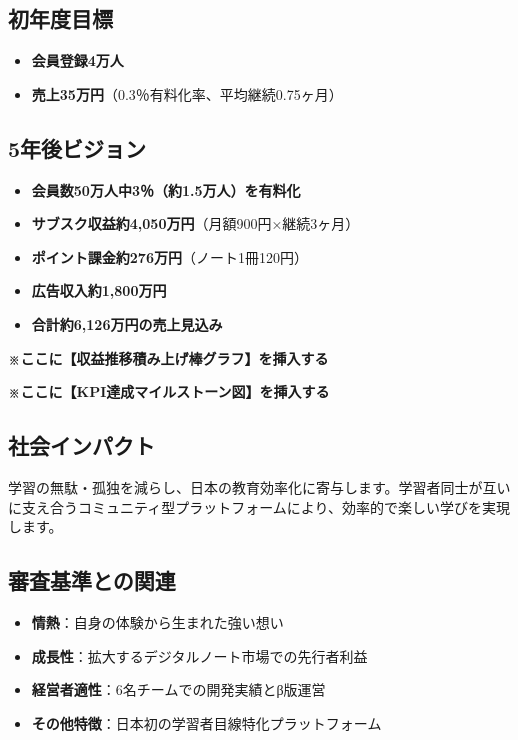 \documentclass[a4paper,12pt]{jsarticle}
\begin{document}
\subsection{初年度目標}
\begin{itemize}
\item \textbf{会員登録4万人}
\item \textbf{売上35万円}（0.3％有料化率、平均継続0.75ヶ月）
\end{itemize}

\subsection{5年後ビジョン}
\begin{itemize}
\item \textbf{会員数50万人中3％（約1.5万人）を有料化}
\item \textbf{サブスク収益約4,050万円}（月額900円×継続3ヶ月）
\item \textbf{ポイント課金約276万円}（ノート1冊120円）
\item \textbf{広告収入約1,800万円}
\item \textbf{合計約6,126万円の売上見込み}
\end{itemize}

\textbf{※ここに【収益推移積み上げ棒グラフ】を挿入する}

\textbf{※ここに【KPI達成マイルストーン図】を挿入する}

\subsection{社会インパクト}
学習の無駄・孤独を減らし、日本の教育効率化に寄与します。学習者同士が互いに支え合うコミュニティ型プラットフォームにより、効率的で楽しい学びを実現します。

\subsection{審査基準との関連}
\begin{itemize}
\item \textbf{情熱}：自身の体験から生まれた強い想い
\item \textbf{成長性}：拡大するデジタルノート市場での先行者利益
\item \textbf{経営者適性}：6名チームでの開発実績とβ版運営
\item \textbf{その他特徴}：日本初の学習者目線特化プラットフォーム
\end{itemize}
\end{document}
